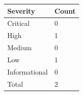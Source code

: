 \documentclass{article}
\begin{document}
                \begin{minipage}{.40\textwidth}
                \renewcommand{\arraystretch}{1.63}
                \begin{tabular}{|p{11em}|>{\centering\arraybackslash}p{6em}|}
                \hline
                \normalsize \cellcolor{black!10} \textbf{Severity} & \normalsize \cellcolor{black!10} \rule{0pt}{5ex} \textbf{Count} \\
                 \hline
                 \normalsize Critical &   \normalsize \cellcolor{critical} 0  \\
                 \hline
                 \normalsize High & \normalsize \cellcolor{high}  1 \\
                 \hline
                 \normalsize Medium & \normalsize \cellcolor{medium}  0 \\
                 \hline
                 \normalsize Low & \normalsize \cellcolor{low}  1 \\
                 \hline
                 \normalsize Informational & \normalsize \cellcolor{info} 0 \\
                 \hline
                 \normalsize Total & \normalsize \cellcolor{total} \rule{0pt}{4ex} 2 \\
                 \hline    
                \end{tabular}
                \end{minipage}

 

            \newpage
\end{document}
